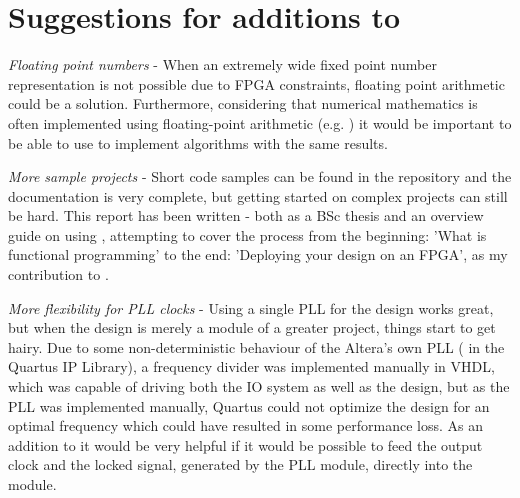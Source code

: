 \section{Suggestions for additions to \clash{}}
\begin{itemizens}
	\item \emph{Floating point numbers} - When an extremely wide fixed point number representation is not possible due to FPGA constraints, floating point arithmetic could be a solution. Furthermore, considering that numerical mathematics is often implemented using floating-point arithmetic (e.g. \matlab{}) it would be important to be able to use \clash{} to implement \matlab{} algorithms with the same results.
	\item \emph{More sample projects} - Short code samples can be found in the  repository and the  documentation is very complete, but getting started on complex projects can still be hard. This report has been written - both as a BSc thesis and an overview guide on using \clash{}, attempting to cover the process from the beginning: 'What is functional programming' to the end: 'Deploying your design on an FPGA', as my contribution to \clash{}.
	\item \emph{More flexibility for PLL clocks} - Using a single PLL for the \clash{} design works great, but when the \clash{} design is merely a module of a greater project, things start to get hairy. Due to some non-deterministic behaviour of the Altera's own PLL ( in the Quartus IP Library), a frequency divider was implemented manually in VHDL, which was capable of driving both the IO system as well as the \clash{} design, but as the PLL was implemented manually, Quartus could not optimize the design for an optimal frequency which could have resulted in some performance loss. As an addition to \clash{} it would be very helpful if it would be possible to feed the output clock and the locked signal, generated by the PLL module, directly into the \clash{} module.
\end{itemizens}
